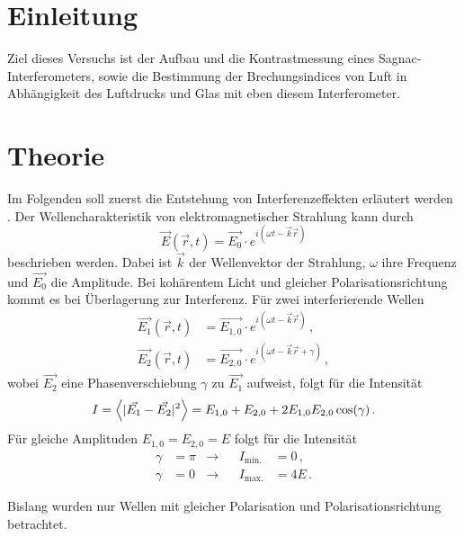 \section{Einleitung}

Ziel dieses Versuchs ist der Aufbau und die Kontrastmessung eines Sagnac-Interferometers, sowie die Bestimmung der Brechungsindices von Luft in Abhängigkeit des Luftdrucks und Glas mit eben diesem Interferometer.

\section{Theorie}

Im Folgenden soll zuerst die Entstehung von Interferenzeffekten erläutert werden \cite{Lit1}.
Der Wellencharakteristik von elektromagnetischer Strahlung kann durch
\begin{equation*}
  \vec{E}(\vec{r},t) = \vec{E_0} \cdot e^{i(\omega t - \vec{k}\vec{r})}
\end{equation*}
beschrieben werden.
Dabei ist $\vec{k}$ der Wellenvektor der Strahlung, $\omega$ ihre Frequenz und $\vec{E_0}$ die Amplitude.
Bei kohärentem Licht und gleicher Polarisationsrichtung kommt es bei Überlagerung zur Interferenz.
Für zwei interferierende Wellen
\begin{align*}
  \vec{E_1}(\vec{r},t) &= \vec{E_{1,0}} \cdot e^{i(\omega t - \vec{k}\vec{r})} \, , \\
  \vec{E_2}(\vec{r},t) &= \vec{E_{2,0}} \cdot e^{i(\omega t - \vec{k}\vec{r} + \gamma)} \, ,
\end{align*}
wobei $\vec{E_2}$ eine Phasenverschiebung $\gamma$ zu $\vec{E_1}$ aufweist, folgt für die Intensität
\begin{equation}
  I = \Bigl \langle |\vec{E_1} - \vec{E_2}|^2 \Bigr \rangle = E_{1,0} + E_{2,0} + 2 E_{1,0} E_{2,0} \cos(\gamma) \, .
  \label{eqn:Intensität}
\end{equation}
Für gleiche Amplituden $E_{1,0} = E_{2,0} = E$ folgt für die Intensität
\begin{equation}  \label{eqn:Gl2}
  \begin{aligned}
  \gamma &= \pi &\rightarrow& &I_\text{min.} &= 0 \, , \\
  \gamma &= 0 &\rightarrow& &I_\text{max.} &= 4E \, .
\end{aligned}
\end{equation}

\bigskip

Bislang wurden nur Wellen mit gleicher Polarisation und Polarisationsrichtung betrachtet.

